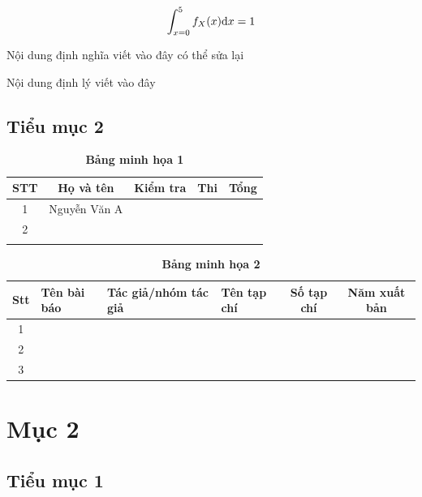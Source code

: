 \documentclass[a4paper,oneside]{thesis}
\begin{document}
\[ \int_{x=0}^5 f_X (x) {\rm d}x=1 \]

\begin{dn}
 Nội dung định nghĩa viết vào đây có thể sửa lại
\end{dn}

\begin{dl}
 Nội dung định lý viết vào đây   
\end{dl}


\subsection{Tiểu mục 2}

\begin{table}[ht]
 \caption{\textbf{Bảng minh họa 1}}
    \centering
    \begin{tabular}{|c|c|c|c|c|}
    \hline
     STT    & Họ và tên & Kiểm tra & Thi & Tổng\\
      \hline
     1    & Nguyễn Văn A &  &  & \\
      \hline
      2   &  &  &  & \\
       \hline
         &  &  &  & \\
       \hline
    \end{tabular} 
\end{table}

\begin{table}[ht]
 \caption{\textbf{Bảng minh họa 2}}
 \centering
\begin{tabular}{|c|l|l|l|c|c|}
		\hline
		\textbf{Stt} &\textbf{Tên bài báo} & \textbf{Tác giả/nhóm tác giả}
		& \textbf{Tên tạp chí} &\textbf{Số tạp chí} & \textbf{Năm xuất bản}
		\\
		\hline
		1 &   &  & &  & \\
		\hline
	2 &   &  & &  & \\
		\hline
        3 &   &  & &  & \\
		\hline
	\end{tabular}
    \end{table}
\section{Mục 2}
\subsection{Tiểu mục 1}
\end{document}
